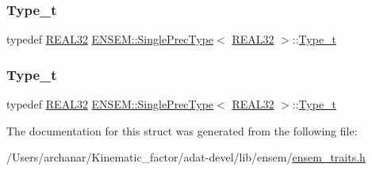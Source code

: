 \mbox{\label{structENSEM_1_1SinglePrecType_3_01REAL32_01_4_a57e2eac17849fab0603ae555b6a2139b}} 
\subsubsection{\texorpdfstring{Type\_t}{Type\_t}\hspace{0.1cm}{\footnotesize\ttfamily [2/3]}}
{\footnotesize\ttfamily typedef \mbox{\hyperlink{namespaceENSEM_a7540d01191172323e9073283d772576d}{R\+E\+A\+L32}} \mbox{\hyperlink{structENSEM_1_1SinglePrecType}{E\+N\+S\+E\+M\+::\+Single\+Prec\+Type}}$<$ \mbox{\hyperlink{namespaceENSEM_a7540d01191172323e9073283d772576d}{R\+E\+A\+L32}} $>$\+::\mbox{\hyperlink{structENSEM_1_1SinglePrecType_3_01REAL32_01_4_a57e2eac17849fab0603ae555b6a2139b}{Type\+\_\+t}}}

\mbox{\label{structENSEM_1_1SinglePrecType_3_01REAL32_01_4_a57e2eac17849fab0603ae555b6a2139b}} 
\subsubsection{\texorpdfstring{Type\_t}{Type\_t}\hspace{0.1cm}{\footnotesize\ttfamily [3/3]}}
{\footnotesize\ttfamily typedef \mbox{\hyperlink{namespaceENSEM_a7540d01191172323e9073283d772576d}{R\+E\+A\+L32}} \mbox{\hyperlink{structENSEM_1_1SinglePrecType}{E\+N\+S\+E\+M\+::\+Single\+Prec\+Type}}$<$ \mbox{\hyperlink{namespaceENSEM_a7540d01191172323e9073283d772576d}{R\+E\+A\+L32}} $>$\+::\mbox{\hyperlink{structENSEM_1_1SinglePrecType_3_01REAL32_01_4_a57e2eac17849fab0603ae555b6a2139b}{Type\+\_\+t}}}



The documentation for this struct was generated from the following file\+:\begin{DoxyCompactItemize}
\item 
/\+Users/archanar/\+Kinematic\+\_\+factor/adat-\/devel/lib/ensem/\mbox{\hyperlink{adat-devel_2lib_2ensem_2ensem__traits_8h}{ensem\+\_\+traits.\+h}}\end{DoxyCompactItemize}
